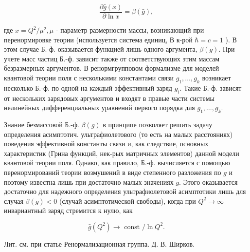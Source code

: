 \documentclass[10pt]{article}
\begin{document}
\[

\frac{\partial \bar{g}(x)}{\partial \ln x}=\beta(\bar{g}),

\]



где $x=Q^{2} / \mu^{2}, \mu$ - параметр размерности массы, возникающий при перенормировке теории (используется система единиц, В к-рой $\hbar=c=1$ ). В этом случае Б.-ф. оказывается функцией лишь одного аргумента, $\beta(g)$. При учете масс частиц Б.-ф. зависит также от соответствующих этим массам безразмерных аргументов. В ренормгрупповом формализме для моделей квантовой теории поля с несколькими константами связи $g_{1}, \ldots, g_{k}$ возникает несколько Б.-ф. по одной на каждый эффективный заряд $g_{i}$. Такие Б.-ф. зависят от нескольких зарядовых аргументов и входят в правые части системы нелинейных дифференциальных уравнений первого порядка для $g_{1}, \ldots, g_{k}$.



Знание безмассовой Б.-ф. $\beta(g)$ в принципе позволяет решить задачу определения асимптотич. ультрафиолетового (то есть на малых расстояниях) поведения эффективной константы связи и, как следствие, основных характеристик (Грина функций, нек-рых матричных элементов) данной модели квантовой теории поля. Однако, как правило, Б.-ф. вычисляется с помощью перенормирований теории возмушений в виде степенного разложения по $g$ и поэтому известна лишь при достаточно малых значениях $g$. Этого оказывается достаточно для надежного определения ультрафиолетовой асимптотики лишь для случая $\beta(g)<0$ (случай асимптотической свободы), когда при $Q^{2} \rightarrow \infty$ инвариантный заряд стремится к нулю, как



\[

\bar{g}\left(Q^{2}\right) \rightarrow \text { const } / \ln Q^{2} .

\]



Лит. см. при статье Ренормализационная группа. Д. В. Ширков.
\end{document}
